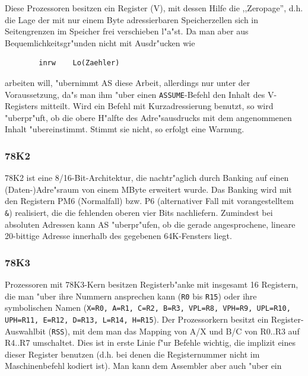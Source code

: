 \documentclass[12pt,a4paper,twoside]{report}
\newcommand{\tty}[1]{{\tt #1}}
\newcommand{\asname}{AS}
\begin{document}
Diese Prozessoren besitzen ein Register (V), mit dessen Hilfe die
,,Zeropage'', d.h. die Lage der mit nur einem Byte adressierbaren
Speicherzellen sich in Seitengrenzen im Speicher frei verschieben l"a"st.
Da man aber aus Bequemlichkeitsgr"unden nicht mit Ausdr"ucken wie
\begin{verbatim}
        inrw    Lo(Zaehler)
\end{verbatim}
arbeiten will, "ubernimmt \asname{} diese Arbeit, allerdings nur unter der
Voraussetzung, da"s man ihm "uber einen \tty{ASSUME}-Befehl den
Inhalt des V-Registers mitteilt.  Wird ein Befehl mit Kurzadressierung
benutzt, so wird "uberpr"uft, ob die obere H"alfte des Adre"sausdrucks
mit dem angenommenen Inhalt "ubereinstimmt.  Stimmt sie nicht, so erfolgt
eine Warnung.


\subsubsection{78K2}

78K2 ist eine 8/16-Bit-Architektur, die nachtr"aglich durch Banking auf
einen (Daten-)Adre"sraum von einem MByte erweitert wurde.  Das Banking
wird mit den Registern PM6 (Normalfall) bzw. P6 (alternativer Fall mit
vorangestelltem \verb!&!) realisiert, die die fehlenden oberen vier Bits
nachliefern.  Zumindest bei absoluten Adressen kann \asname{} "uberpr"ufen, ob
die gerade angesprochene, lineare 20-bittige Adresse innerhalb des
gegebenen 64K-Fensters liegt.


\subsubsection{78K3}

Prozessoren mit 78K3-Kern besitzen Registerb"anke mit insgesamt 16 Registern,
die man "uber ihre Nummern ansprechen kann (\tty{R0} bis \tty{R15}) oder ihre symbolischen
Namen (\tty{X=R0, A=R1, C=R2, B=R3, VPL=R8, VPH=R9, UPL=R10, UPH=R11, E=R12,
D=R13, L=R14, H=R15}).  Der Prozessorkern besitzt ein Register-Auswahlbit
(\tty{RSS}), mit dem man das Mapping von A/X und B/C von R0..R3 auf R4..R7
umschaltet.  Dies ist in erste Linie f"ur Befehle wichtig, die implizit eines
dieser Register benutzen (d.h. bei denen die Registernummer nicht im Maschinenbefehl
kodiert ist).  Man kann dem Assembler aber auch "uber ein
\end{document}
